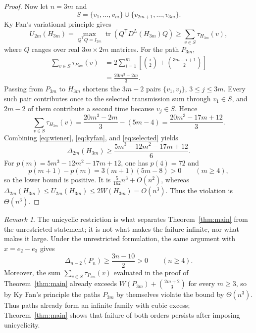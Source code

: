 \documentclass[11pt]{amsart}
\theoremstyle{remark}
\newtheorem{remark}[theorem]{Remark}
\newcommand{\DL}{D^{L}}
\newcommand{\gap}{\Delta}
\begin{document}
\begin{proof}
Now let $n=3m$ and
\[
S=\{v_1,\ldots,v_m\}\cup\{v_{2m+1},\ldots,v_{3m}\}.
\]
Ky Fan's variational principle \cite{Fan} gives
\begin{equation}\label{eq:kyfan}
U_{2m}(H_{3m})
=
\max_{Q^{\mathsf T}Q=I_{2m}}
\operatorname{tr}\!\left(Q^{\mathsf T}\DL(H_{3m})Q\right)
\ge
\sum_{v\in S}\tau_{H_{3m}}(v),
\end{equation}
where $Q$ ranges over real $3m\times2m$ matrices. For the path $P_{3m}$,
\begin{align*}
\sum_{v\in S}\tau_{P_{3m}}(v)
&=
2\sum_{i=1}^{m}
\left[\binom{i}{2}+\binom{3m-i+1}{2}\right]\\
&=
\frac{20m^3-2m}{3}.
\end{align*}
Passing from $P_{3m}$ to $H_{3m}$ shortens the $3m-2$ pairs
$\{v_1,v_j\}$, $3\le j\le3m$. Every such pair contributes once to the selected transmission sum through $v_1\in S$, and $2m-2$ of them contribute a second time because $v_j\in S$. Hence
\begin{equation}\label{eq:selected}
\sum_{v\in S}\tau_{H_{3m}}(v)
=
\frac{20m^3-2m}{3}-(5m-4)
=
\frac{20m^3-17m+12}{3}.
\end{equation}
Combining \eqref{eq:wiener}, \eqref{eq:kyfan}, and \eqref{eq:selected} yields
\[
\gap_{2m}(H_{3m})
\ge
\frac{5m^3-12m^2-17m+12}{6}.
\]
For $p(m)=5m^3-12m^2-17m+12$, one has $p(4)=72$ and
\[
p(m+1)-p(m)=3(m+1)(5m-8)>0
\qquad(m\ge4),
\]
so the lower bound is positive. It is $\frac{5}{162}n^3+O(n^2)$, whereas
$\gap_{2m}(H_{3m})\le U_{2m}(H_{3m})\le2W(H_{3m})=O(n^3)$.
Thus the violation is $\Theta(n^3)$.
\end{proof}

\begin{remark}
The unicyclic restriction is what separates Theorem~\ref{thm:main} from the unrestricted statement; it is not what makes the failure infinite, nor what makes it large. Under the unrestricted formulation, the same argument with $x=e_2-e_3$ gives
\[
\gap_{n-2}(P_n)\ge\frac{3n-10}{2}>0
\qquad(n\ge4).
\]
Moreover, the sum $\sum_{v\in S}\tau_{P_{3m}}(v)$ evaluated in the proof of Theorem~\ref{thm:main} already exceeds $W(P_{3m})+\binom{2m+2}{3}$ for every $m\ge3$, so by Ky Fan's principle \cite{Fan} the paths $P_{3m}$ by themselves violate the bound by $\Theta(n^3)$. Thus paths already form an infinite family with cubic excess; Theorem~\ref{thm:main} shows that failure of both orders persists after imposing unicyclicity.
\end{remark}
\end{document}
